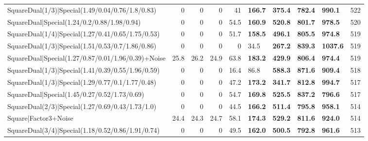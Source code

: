 \begin{tabular}{lrrrrllllr}
 SquareDual(1/3)|Special(1.49/0.04/0.76/1.8/0.83)        &          0   &          0   &          0   &            41   & \textbf{166.7} & \textbf{375.4} & \textbf{782.4} & \textbf{990.1}  &          522 \\
 SquareDual|Special(1.24/0.2/0.88/1.98/0.94)             &          0   &          0   &          0   &            54.5 & \textbf{160.9} & \textbf{520.8} & \textbf{801.7} & \textbf{978.5}  &          520 \\
 SquareDual(1/4)|Special(1.27/0.41/0.65/1.75/0.53)       &          0   &          0   &          0   &            51.7 & \textbf{158.5} & \textbf{496.1} & \textbf{805.5} & \textbf{974.8}  &          519 \\
 SquareDual(1/3)|Special(1.51/0.53/0.7/1.86/0.86)        &          0   &          0   &          0   &             0   & 34.5           & \textbf{267.2} & \textbf{839.3} & \textbf{1037.6} &          519 \\
 SquareDual|Special(1.27/0.87/0.01/1.96/0.39)+Noise      &         25.8 &         26.2 &         24.9 &            63.8 & \textbf{183.2} & \textbf{429.9} & \textbf{806.4} & \textbf{974.4}  &          519 \\
 SquareDual(1/3)|Special(1.41/0.39/0.55/1.96/0.59)       &          0   &          0   &          0   &            16.4 & 86.8           & \textbf{588.3} & \textbf{871.6} & \textbf{909.4}  &          518 \\
 SquareDual(1/3)|Special(1.29/0.77/0.1/1.77/0.48)        &          0   &          0   &          0   &            47.2 & \textbf{173.2} & \textbf{341.7} & \textbf{812.8} & \textbf{994.7}  &          517 \\
 SquareDual|Special(1.45/0.27/0.52/1.73/0.69)            &          0   &          0   &          0   &            54.7 & \textbf{169.8} & \textbf{525.5} & \textbf{837.2} & \textbf{796.6}  &          517 \\
 SquareDual(2/3)|Special(1.27/0.69/0.43/1.73/1.0)        &          0   &          0   &          0   &            44.5 & \textbf{166.2} & \textbf{511.4} & \textbf{795.8} & \textbf{958.1}  &          514 \\
 Square|Factor3+Noise                                    &         24.4 &         24.3 &         24.7 &            58.1 & \textbf{174.3} & \textbf{529.2} & \textbf{811.6} & \textbf{924.0}  &          514 \\
 SquareDual(3/4)|Special(1.18/0.52/0.86/1.91/0.74)       &          0   &          0   &          0   &            49.5 & \textbf{162.0} & \textbf{500.5} & \textbf{792.8} & \textbf{961.6}  &          513 \\

\end{tabular}
